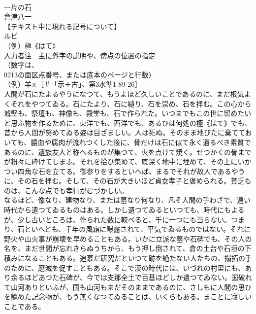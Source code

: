 \documentclass[8pt]{extreport}
\begin{document}
\begin{CJK}{UTF8}{min}
\\	一片の石
\\	會津八一
\\	【テキスト中に現れる記号について】
\\	ルビ
\\	（例）極《はて》
\\	入力者注　主に外字の説明や、傍点の位置の指定
\\	（数字は、
\\	0213の面区点番号、または底本のページと行数）
\\	（例）羊※［＃「示＋古」、第3水準1-89-26］
\\	人間が石にたよるやうになつて、もうよほど久しいことであるのに、まだ根気よくそれをやつてゐる。石にたより、石に縋り、石を崇め、石を拝む。この心から城壁も、祭壇も、神像も、殿堂も、石で作られた。いつまでもこの世に留めたいと思ふ物を作るために、東洋でも、西洋でも、あるひは何処の極《はて》でも、昔から人間が努めてゐる姿は目ざましい。人は死ぬ。そのまま地びたに棄てておいても、膿血や腐肉が流れつくした後に、骨だけは石に似て永く遺るべき素質であるのに、遺族友人と称へるものが集つて、火を点けて焼く。せつかくの骨までが粉々に砕けてしまふ。それを拾ひ集めて、底深く地中に埋めて、その上にいかつい四角な石を立てる。御参りをするといへば、まるでそれが故人であるやうに、その石を拝む。そして、その石が大きいほど貞女孝子と褒められる。貧乏ものは、こんな点でも孝行がむづかしい。
\\	なるほど、像なり、建物なり、または墓なり何なり、凡そ人間の手わざで、遠い時代から遺つてゐるものはある。しかし遺つてゐるといつても、時代にもよるが、少し古いところは、作られた数に較べると、千に一つにも当らない。つまり、石といへども、千年の風霜に曝露されて、平気でゐるものではない。それに野火や山火事が崩壊を早めることもある。いかに立派な墓や石碑でも、その人の名を、まだ世間が忘れきらぬうちから、もう押し倒されて、倉の土台や石垣の下積みになることもある。追慕だ研究だといつて跡を絶たない人たちの、搨拓の手のために、磨滅を促すこともある。そこで漢の時代には、いづれの村里にも、あり余るほどあつた石碑が、今では支那全土で百基ほどしか遺つてゐない。国破れて山河ありといふが、国も山河もまだそのままであるのに、さしもに人間の思ひを籠めた記念物が、もう無くなつてゐることは、いくらもある。まことに寂しいことである。

\end{CJK}
\end{document}
